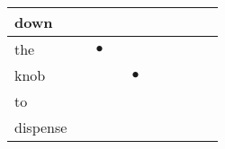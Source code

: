\documentclass[landscape]{article}
\newcommand{\ssp}{\hspace{2pt}}
\newcommand{\mex}{\cellcolor{g}$\bullet$}
\begin{document}
\begin{tabular}{|l|p{10pt}|p{10pt}|p{10pt}|p{10pt}|p{10pt}|p{10pt}|p{10pt}|p{10pt}|p{10pt}|}
\hline
\ssp down \ssp&\hspace{2pt}&\hspace{2pt}&\hspace{2pt}&\hspace{2pt}&\hspace{2pt}&\hspace{2pt}&\hspace{2pt}&\hspace{2pt}&\hspace{2pt}\\
\hline
\ssp \cellcolor{ref1}the \ssp&\hspace{2pt}&\hspace{2pt}\mex&\hspace{2pt}&\hspace{2pt}&\hspace{2pt}&\hspace{2pt}&\hspace{2pt}&\hspace{2pt}&\hspace{2pt}\\
\hline
\ssp \cellcolor{ref3}knob \ssp&\hspace{2pt}&\hspace{2pt}&\hspace{2pt}&\hspace{2pt}\mex&\hspace{2pt}&\hspace{2pt}&\hspace{2pt}&\hspace{2pt}&\hspace{2pt}\\
\hline
\ssp to \ssp&\hspace{2pt}&\hspace{2pt}&\hspace{2pt}&\hspace{2pt}&\hspace{2pt}&\hspace{2pt}&\hspace{2pt}&\hspace{2pt}&\hspace{2pt}\\
\hline
\ssp dispense \ssp&\hspace{2pt}&\hspace{2pt}&\hspace{2pt}&\hspace{2pt}&\hspace{2pt}&\hspace{2pt}&\hspace{2pt}&\hspace{2pt}&\hspace{2pt}\\

\end{tabular}
\end{document}
